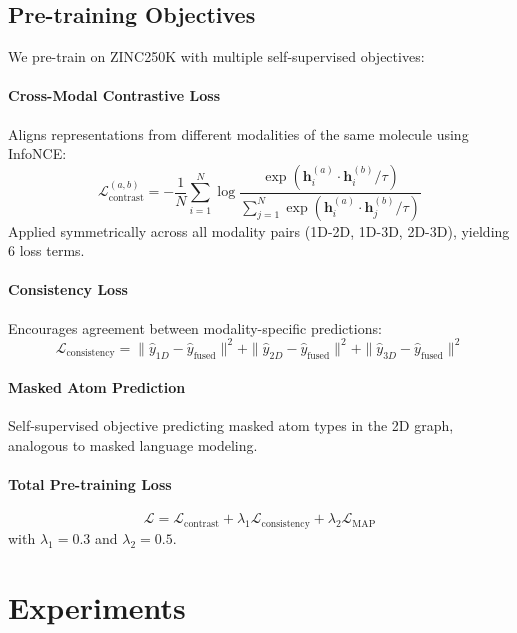 \documentclass[11pt]{article}
\begin{document}
\subsection{Pre-training Objectives}

We pre-train on ZINC250K \citep{sterling2015zinc} with multiple self-supervised objectives:

\paragraph{Cross-Modal Contrastive Loss}
Aligns representations from different modalities of the same molecule using InfoNCE:
\begin{equation}
    \mathcal{L}_{\text{contrast}}^{(a,b)} = -\frac{1}{N}\sum_{i=1}^{N} \log \frac{\exp(\mathbf{h}_i^{(a)} \cdot \mathbf{h}_i^{(b)} / \tau)}{\sum_{j=1}^{N} \exp(\mathbf{h}_i^{(a)} \cdot \mathbf{h}_j^{(b)} / \tau)}
\end{equation}
Applied symmetrically across all modality pairs (1D-2D, 1D-3D, 2D-3D), yielding 6 loss terms.

\paragraph{Consistency Loss}
Encourages agreement between modality-specific predictions:
\begin{equation}
    \mathcal{L}_{\text{consistency}} = \|\hat{y}_{1D} - \hat{y}_{\text{fused}}\|^2 + \|\hat{y}_{2D} - \hat{y}_{\text{fused}}\|^2 + \|\hat{y}_{3D} - \hat{y}_{\text{fused}}\|^2
\end{equation}

\paragraph{Masked Atom Prediction}
Self-supervised objective predicting masked atom types in the 2D graph, analogous to masked language modeling.

\paragraph{Total Pre-training Loss}
\begin{equation}
    \mathcal{L} = \mathcal{L}_{\text{contrast}} + \lambda_1 \mathcal{L}_{\text{consistency}} + \lambda_2 \mathcal{L}_{\text{MAP}}
\end{equation}
with $\lambda_1 = 0.3$ and $\lambda_2 = 0.5$.

\section{Experiments}
\label{sec:experiments}
\end{document}
